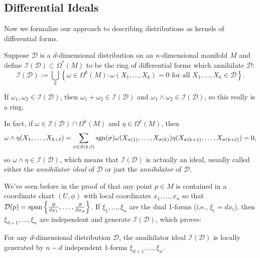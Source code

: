 \subsection{Differential Ideals} 
\label{sub:differential_ideals}

Now we formalize our approach to describing distributions as kernels of differential forms.

\begin{definition}\label{def:annihilator ideal}
	Suppose $\mathcal{D}$ is a $d$-dimensional distribution on an $n$-dimensional manifold $M$ and define $\mathcal{I}(\mathcal{D}) \subset \Omega^\ast (M)$ to be the ring of differential forms which annihilate $\mathcal{D}$:
	\[
		\mathcal{I}(\mathcal{D}) := \bigcup_k \left\{ \omega \in \Omega^k(M) : \omega(X_1, \dots , X_k) = 0 \text{ for all } X_1, \dots , X_k \in \mathcal{D} \right\}.
	\]
\end{definition}

If $\omega_1, \omega_2 \in \mathcal{I}(\mathcal{D})$, then $\omega_1 + \omega_2 \in \mathcal{I}(\mathcal{D})$ and $\omega_1 \wedge \omega_2 \in \mathcal{I}(\mathcal{D})$, so this really is a ring.

In fact, if $\omega \in \mathcal{I}(\mathcal{D}) \cap \Omega^k(M)$ and $\eta \in \Omega^\ell(M)$, then
\[
	\omega \wedge \eta (X_1, \dots , X_{k+\ell}) = \sum_{\sigma \in S(k,\ell)} \operatorname{sgn}(\sigma) \omega(X_{\sigma(1)}, \dots , X_{\sigma(k)}) \eta(X_{\sigma(k+1)}, \dots , X_{\sigma(k+\ell)}) = 0,
\]
so $\omega \wedge \eta \in \mathcal{I}(\mathcal{D})$, which means that $\mathcal{I}(\mathcal{D})$ is actually an ideal, usually called either the \emph{annihilator ideal} of $\mathcal{D}$ or just the \emph{annihilator} of $\mathcal{D}$.

We've seen before in the proof of  that any point $p \in M$ is contained in a coordinate chart $(U,\phi)$ with local coordinates $x_1, \dots , x_n$ so that $\mathcal{D}(p) = \operatorname{span} \left\{\frac{\partial}{\partial x_1}, \dots , \frac{\partial}{\partial x_d} \right\}$. If $\xi_1, \dots , \xi_n$ are the dual 1-forms (i.e., $\xi_i = dx_i$), then $\xi_{d+1}, \dots , \xi_n$ are independent and generate $\mathcal{I}(\mathcal{D})$, which proves:

\begin{lemma}\label{lem:annihilator generators}
	For any $d$-dimensional distribution $\mathcal{D}$, the annihilator ideal $\mathcal{I}(\mathcal{D})$ is locally generated by $n-d$ independent $1$-forms $\xi_{d+1},\dots , \xi_n$.
\end{lemma}

